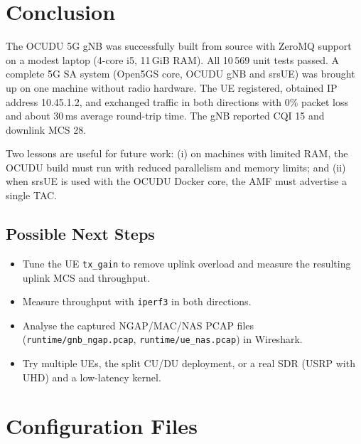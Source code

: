\documentclass[11pt,a4paper]{article}
\newcommand{\fpath}[1]{\texttt{#1}}
\begin{document}
\section{Conclusion}

The OCUDU 5G gNB was successfully built from source with ZeroMQ support on a
modest laptop (4-core i5, 11\,GiB RAM). All 10\,569 unit tests passed. A
complete 5G SA system (Open5GS core, OCUDU gNB and srsUE) was brought up on
one machine without radio hardware. The UE registered, obtained IP address
10.45.1.2, and exchanged traffic in both directions with 0\% packet loss and
about 30\,ms average round-trip time. The gNB reported CQI 15 and downlink
MCS 28.

Two lessons are useful for future work: (i) on machines with limited RAM, the
OCUDU build must run with reduced parallelism and memory limits; and (ii) when
srsUE is used with the OCUDU Docker core, the AMF must advertise a single TAC.

\subsection*{Possible Next Steps}
\begin{itemize}[itemsep=2pt]
  \item Tune the UE \texttt{tx\_gain} to remove uplink overload and measure the
        resulting uplink MCS and throughput.
  \item Measure throughput with \texttt{iperf3} in both directions.
  \item Analyse the captured NGAP/MAC/NAS PCAP files
        (\fpath{runtime/gnb\_ngap.pcap}, \fpath{runtime/ue\_nas.pcap}) in Wireshark.
  \item Try multiple UEs, the split CU/DU deployment, or a real SDR
        (USRP with UHD) and a low-latency kernel.
\end{itemize}

\appendix
\section{Configuration Files}
\end{document}
